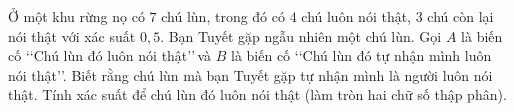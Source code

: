 \begin{ex}%
Ở một khu rừng nọ có $7$ chú lùn, trong đó có $4$ chú luôn nói thật, $3$ chú còn lại nói thật với  xác suất $0{,}5$. Bạn Tuyết gặp ngẫu nhiên một chú lùn. Gọi $A$ là biến cố \lq\lq Chú lùn đó luôn nói thật\rq\rq\,và $B$ là biến cố \lq\lq Chú lùn đó tự nhận mình luôn nói thật\rq\rq. Biết rằng chú lùn mà bạn Tuyết gặp tự nhận mình là người luôn nói thật. Tính xác suất để chú lùn đó luôn nói thật (làm tròn hai chữ số thập phân).
\end{ex}
	

